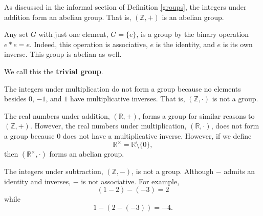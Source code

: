 \documentclass{amsart}
\begin{document}
\begin{example}
	As discussed in the informal section of Definition \ref{groups}, the
	integers under addition form an abelian group. That is, \((\mathbb{Z}, +)\)
	is an abelian group.
\end{example}

\begin{example}\label{trivial-group}
   Any set \(G\) with just one element, \(G = \{e\}\), is a group by the binary
	operation \(e\ast e = e\). Indeed, this operation is associative, \(e\) is
	the identity, and \(e\) is its own inverse. This group is abelian as well.

	We call this the \textbf{trivial group}.
\end{example}

\begin{example}
   The integers under multiplication do not form a group because no elements
	besides \(0\), \(-1\), and \(1\) have multiplicative inverses. That is,
	\((\mathbb{Z}, \cdot)\) is not a group.
\end{example}

\begin{example}\label{Rtimes}
   The real numbers under addition, \((\mathbb{R}, +)\), forms a group for
	similar reasons to \((\mathbb{Z}, +)\). However, the real numbers
	under multiplication, \((\mathbb{R}, \cdot)\), does not form a group because
	\(0\) does not have a multiplicative inverse. However, if we define 
	\[
		\mathbb{R}^\times = \mathbb{R}\setminus\{0\},
	\] 
	then \((\mathbb{R}^\times, \cdot)\) forms an abelian group.
\end{example}

\begin{example}
   The integers under subtraction, \((\mathbb{Z}, -)\), is not a group.
	Although \(-\) admits an identity and inverses, \(-\) is not associative.
	For example,
	\[
		(1 - 2) - (-3) = 2
	\]
	while 
	\[
	   1-(2-(-3)) = -4.
	\]
\end{example}
\end{document}

